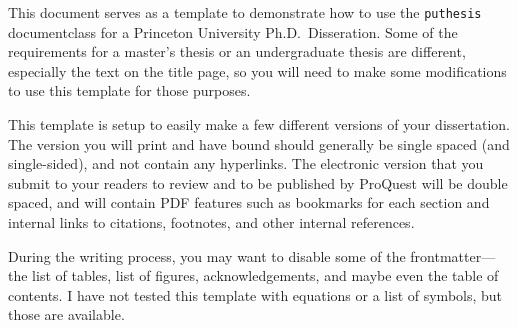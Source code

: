This document serves as a template to demonstrate how to use the \texttt{puthesis} documentclass for a Princeton University Ph.D.\ Disseration. Some of the requirements for a master's thesis or an undergraduate thesis are different, especially the text on the title page, so you will need to make some modifications to use this template for those purposes.

This template is setup to easily make a few different versions of your dissertation. The version you will print and have bound should generally be single spaced (and single-sided), and not contain any hyperlinks. The electronic version that you submit to your readers to review and to be published by ProQuest will be double spaced, and will contain PDF features such as bookmarks for each section and internal links to citations, footnotes, and other internal references.

During the writing process, you may want to disable some of the
frontmatter---the list of tables, list of figures, acknowledgements, and maybe even the table of contents. I have not tested this template with equations or a list of symbols, but those are available.
